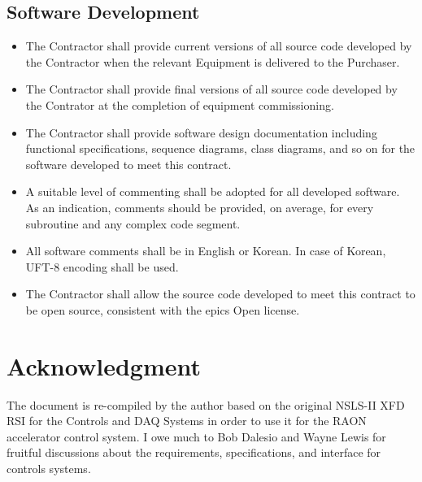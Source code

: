 \documentclass[11pt
  , a4paper
  , article
  , oneside
]{memoir}
\begin{document}
\section{Software Development}
\begin{itemize}
\item The Contractor shall provide current versions of all source code developed by the Contractor when the relevant Equipment is delivered to the Purchaser.
\item The Contractor shall provide final versions of all source code developed by the Contrator at the completion of equipment commissioning.
\item The Contractor shall provide software design documentation including functional specifications, sequence diagrams, class diagrams, and so on for the software developed to meet this contract.
\item A suitable level of commenting shall be adopted for all developed software. As an indication, comments should be provided, on average, for every subroutine and any complex code segment.
\item All software comments shall be in English or Korean. In case of Korean, UFT-8 encoding shall be used.
\item The Contractor shall allow the source code developed to meet this contract to be open source, consistent with the \Gls{epics} Open license.  
\end{itemize}

\chapter{Acknowledgment}
The document is re-compiled by the author based on the original NSLS-II XFD RSI for the Controls and DAQ Systems \cite{LT-C-XFD-RSI-CO-001} in order to use it for the RAON accelerator control system. I owe much to Bob Dalesio and Wayne Lewis for fruitful discussions about the requirements, specifications, and interface for controls systems.


\clearpage
%
%
%

%

\end{document}

